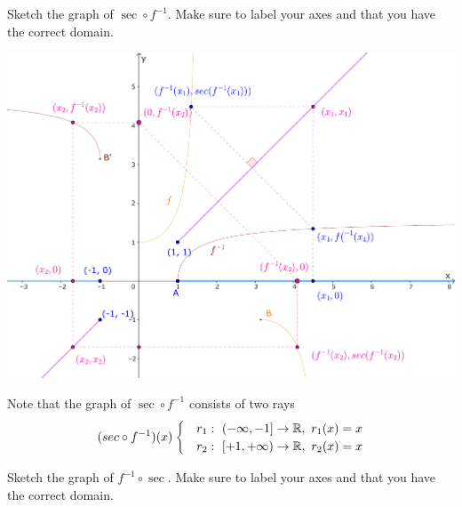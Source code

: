 \documentclass{article}
\begin{document}
\newpage

\begin{problem*}[1c]
    Sketch the graph of $\sec \circ f^{-1}.$ Make sure to label your axes and that you have the correct domain.
\end{problem*}

\begin{center}
    \includegraphics[width=16cm]{./svg/pdf/derivative-2-1c.pdf}
\end{center}

\begin{soln}
    Note that the graph of $\sec \circ f^{-1}$ consists of two rays
    \[
        (sec \circ f^{-1})(x)
        \begin{cases}
            &r_1:\ \left( -\infty, -1 \right] \rightarrow \RR,\ r_1(x) = x\\
            &r_2:\ \left[ +1, +\infty \right) \rightarrow \RR,\ r_2(x) = x\\
        \end{cases}
    \]
\end{soln}

\newpage

\begin{problem*}[1d]
    Sketch the graph of $f^{-1} \circ \sec.$ Make sure to label your axes and that you have the correct domain.
\end{problem*}
\end{document}
